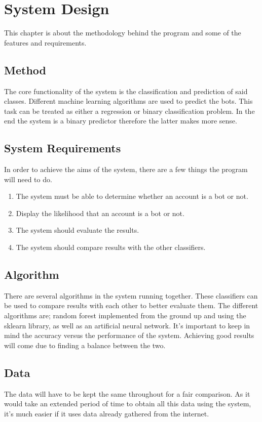 
\chapter{System Design}

\label{Chapter4}
This chapter is about the methodology behind the program and some of the features and requirements.

\section{Method}
The core functionality of the system is the classification and prediction of said classes. Different machine learning algorithms are used to predict the bots. This task can be treated as either a regression or binary classification problem. In the end the system is a binary predictor therefore the latter makes more sense. 


\section{System Requirements}
In order to achieve the aims of the system, there are a few things the program will need to do.
\begin{enumerate}
	\item The system must be able to determine whether an account is a bot or not.
	\item Display the likelihood that an account is a bot or not.
    \item The system should evaluate the results.
    \item The system should compare results with the other classifiers.
\end{enumerate}

\section{Algorithm}
There are several algorithms in the system running together. These classifiers can be used to compare results with each other to better evaluate them. The different algorithms are; random forest implemented from the ground up and using the sklearn library, as well as an artificial neural network. It's important to keep in mind the accuracy versus the performance of the system. Achieving good results will come due to finding a balance between the two. 


\section{Data}
The data will have to be kept the same throughout for a fair comparison. As it would take an extended period of time to obtain all this data using the system, it's much easier if it uses data already gathered from the internet. 

